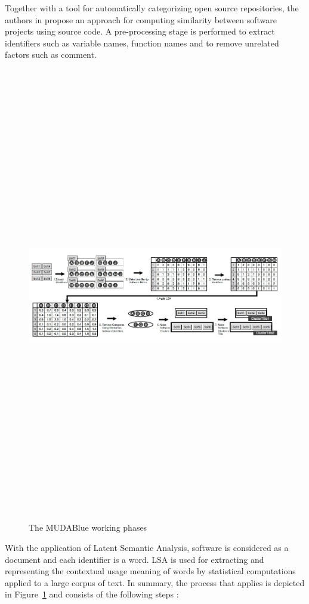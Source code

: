 Together with a tool for automatically categorizing open source repositories, the authors in \cite{10.1109/APSEC.2004.69} propose an approach for computing similarity between software projects using source code. A pre-processing stage is performed to extract identifiers such as variable names, function names and to remove unrelated factors such as comment.

\begin{figure}[!h]
	\includegraphics[width=15cm,height=20cm,keepaspectratio]{images/Mudablue1.png}
	\centering
	\caption{The MUDABlue working phases \cite{10.1109/APSEC.2004.69}}
	\label{fig:MUDABlue}
\end{figure}

With the application of Latent Semantic Analysis, software is considered as a document and each identifier is a word. LSA is used for extracting and representing the contextual usage meaning of words by statistical computations applied to a large corpus of text. In summary, the process that \MUDABlue applies is depicted in Figure~\ref{fig:MUDABlue} and consists of the following steps \cite{10.1109/APSEC.2004.69}:%

